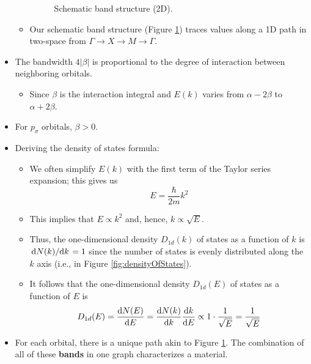 \documentclass[../notes.tex]{subfiles}
\begin{document}
\begin{itemize}
\begin{itemize}
\begin{figure}[H]
            \caption{Schematic band structure (2D).}
            \label{fig:schematicBands-2D}
        \end{figure}
        \item Our schematic band structure (Figure \ref{fig:schematicBands-2D}) traces values along a 1D path in two-space from $\Gamma\to X\to M\to\Gamma$.
    \end{itemize}
    \item {}The bandwidth $4|\beta|$ is proportional to the degree of interaction between neighboring orbitals.
    \begin{itemize}
        \item Since $\beta$ is the interaction integral and $E(k)$ varies from $\alpha-2\beta$ to $\alpha+2\beta$.
    \end{itemize}
    \item For $p_\sigma$ orbitals, $\beta>0$.
    \item Deriving the density of states formula:
    \begin{itemize}
        \item We often simplify $E(k)$ with the first term of the Taylor series expansion; this gives us
        \begin{equation*}
            E = \frac{\hbar}{2m}k^2
        \end{equation*}
        \item This implies that $E\propto k^2$ and, hence, $k\propto\sqrt{E}$.
        \item Thus, the one-dimensional density $D_{1d}(k)$ of states as a function of $k$ is $\dv*{N(k)}{k}=1$ since the number of states is evenly distributed along the $k$ axis (i.e., in Figure \ref{fig:densityOfStates}).
        \item It follows that the one-dimensional density $D_{1d}(E)$ of states as a function of $E$ is
        \begin{equation*}
            D_{1d}(E) = \dv{N(E)}{E}
            = \dv{N(k)}{k}\dv{k}{E}
            \propto 1\cdot\frac{1}{\sqrt{E}}
            = \frac{1}{\sqrt{E}}
        \end{equation*}
    \end{itemize}
    \item For each orbital, there is a unique path akin to Figure \ref{fig:schematicBands-2D}. The combination of all of these \textbf{bands} in one graph characterizes a material.

\end{itemize}
\end{document}
